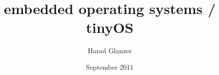 
\title{embedded operating systems / tinyOS}
\author{Harad Glanzer}
\address{Hardtgasse 25 / 12A, 1190 Wien}
\date{September 2011}


